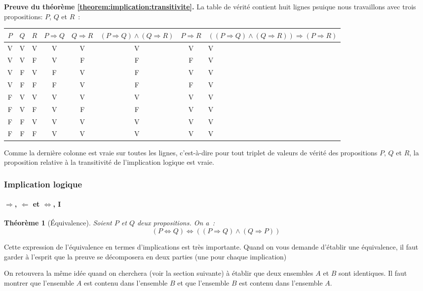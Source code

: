 \documentclass[10pt,notheorems]{beamer}
\theoremstyle{plain}
\newtheorem{theorem}{Théorème}
\theoremstyle{definition} %
\begin{document}
\begin{notes}
  \textbf{Preuve du théorème \ref{theorem:implication:transitivite}.}
  La table de vérité contient huit lignes psuique nous travaillons
  avec trois propositions: $P$, $Q$ et $R$ :

  \begin{table}[H]
    \begin{tabular}[H]{|ccc|ccccg|}
      \hline
      $P$ & $Q$ & $R$ & $P\Rightarrow Q$ & $Q\Rightarrow R$ & $(P\Rightarrow Q) \land (Q\Rightarrow R)$ & $P\Rightarrow R$ & $((P\Rightarrow Q) \land (Q\Rightarrow R))\Rightarrow (P\Rightarrow R)$\\ \hline
      V & V & V & V & V & V & V & V \\
      V & V & F & V & F & F & F & V \\
      V & F & V & F & V & F & V & V \\
      V & F & F & F & V & F & F & V \\
      F & V & V & V & V & V & V & V \\
      F & V & F & V & F & F & V & V \\
      F & F & V & V & V & V & V & V \\
      F & F & F & V & V & V & V & V \\
      \hline\hline
    \end{tabular}
  \end{table}
    
  Comme la dernière colonne est vraie sur toutes les lignes,
  c'est-à-dire pour tout triplet de valeurs de vérité des propositions
  $P$, $Q$ et $R$, la proposition relative à la transitivité de
  l'implication logique est vraie.
\end{notes}


\begin{frame}
  \frametitle{Implication logique}
  \framesubtitle{$\Rightarrow$, $\Leftarrow$ et $\Leftrightarrow$, I}

  \begin{theorem}[Équivalence]\label{theorem:implication:equivalence}
    Soient $P$ et $Q$ deux propositions. On a :
    \[
      (P\Leftrightarrow Q) \Leftrightarrow ((P\Rightarrow Q) \land
      (Q\Rightarrow P))
    \]
  \end{theorem}

  \bigskip

  Cette expression de l'équivalence en termes d'implications est très
  importante. Quand on vous demande d'établir une équivalence, il faut
  garder à l'esprit que la preuve se décomposera en deux parties (une
  pour chaque implication)\newline

  On retouvera la même idée quand on cherchera (voir la section
  suivante) à établir que deux ensembles $A$ et $B$ sont
  identiques. Il faut montrer que l'ensemble $A$ est contenu dans
  l'ensemble $B$ et que l'ensemble $B$ est contenu dans l'ensemble
  $A$.\newline

\end{frame}
\end{document}

